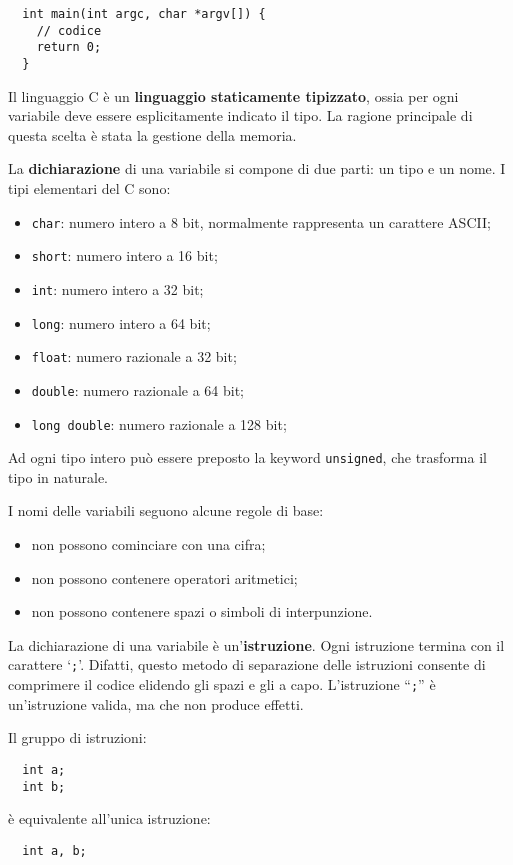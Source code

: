 \begin{verbatim}
  int main(int argc, char *argv[]) {
    // codice
    return 0;
  }
\end{verbatim}

Il linguaggio C è un {\bf linguaggio staticamente tipizzato}, ossia per ogni variabile deve essere esplicitamente indicato il tipo.
La ragione principale di questa scelta è stata la gestione della memoria.

La {\bf dichiarazione} di una variabile si compone di due parti: un tipo e un nome.
I tipi elementari del C sono:
\begin{itemize}
  \item \verb|char|: numero intero a 8 bit, normalmente rappresenta un carattere ASCII;
  \item \verb|short|: numero intero a 16 bit;
  \item \verb|int|: numero intero a 32 bit;
  \item \verb|long|: numero intero a 64 bit;
  \item \verb|float|: numero razionale a 32 bit;
  \item \verb|double|: numero razionale a 64 bit;
  \item \verb|long double|: numero razionale a 128 bit;
\end{itemize}
Ad ogni tipo intero può essere preposto la keyword \verb|unsigned|, che trasforma il tipo in naturale.

I nomi delle variabili seguono alcune regole di base:
\begin{itemize}
  \item non possono cominciare con una cifra;
  \item non possono contenere operatori aritmetici;
  \item non possono contenere spazi o simboli di interpunzione.
\end{itemize}

La dichiarazione di una variabile è un'{\bf istruzione}.
Ogni istruzione termina con il carattere `\verb|;|'. Difatti, questo metodo di separazione delle istruzioni consente di comprimere il codice elidendo gli spazi e gli a capo.
L'istruzione ``\verb|;|'' è un'istruzione valida, ma che non produce effetti.

Il gruppo di istruzioni:
\begin{verbatim}
  int a;
  int b;
\end{verbatim}
è equivalente all'unica istruzione:
\begin{verbatim}
  int a, b;
\end{verbatim}

